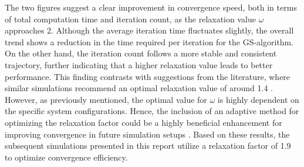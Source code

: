 The two figures suggest a clear improvement in convergence speed, both in terms of total computation time and iteration count, as the relaxation value $\omega$ approaches 2. Although the average iteration time fluctuates slightly, the overall trend shows a reduction in the time required per iteration for the \acs{GS}-algorithm. On the other hand, the iteration count follows a more stable and consistent trajectory, further indicating that a higher relaxation value leads to better performance. This finding contrasts with suggestions from the literature, where similar simulations recommend an optimal relaxation value of around 1.4 \cite{brieda_plasma_2019}. However, as previously mentioned, the optimal value for $\omega$ is highly dependent on the specific system configurations. Hence, the inclusion of an adaptive method for optimizing the relaxation factor could be a highly beneficial enhancement for improving convergence in future simulation setups \cite{brieda_plasma_2019}. Based on these results, the subsequent simulations presented in this report utilize a relaxation factor of 1.9 to optimize convergence efficiency.